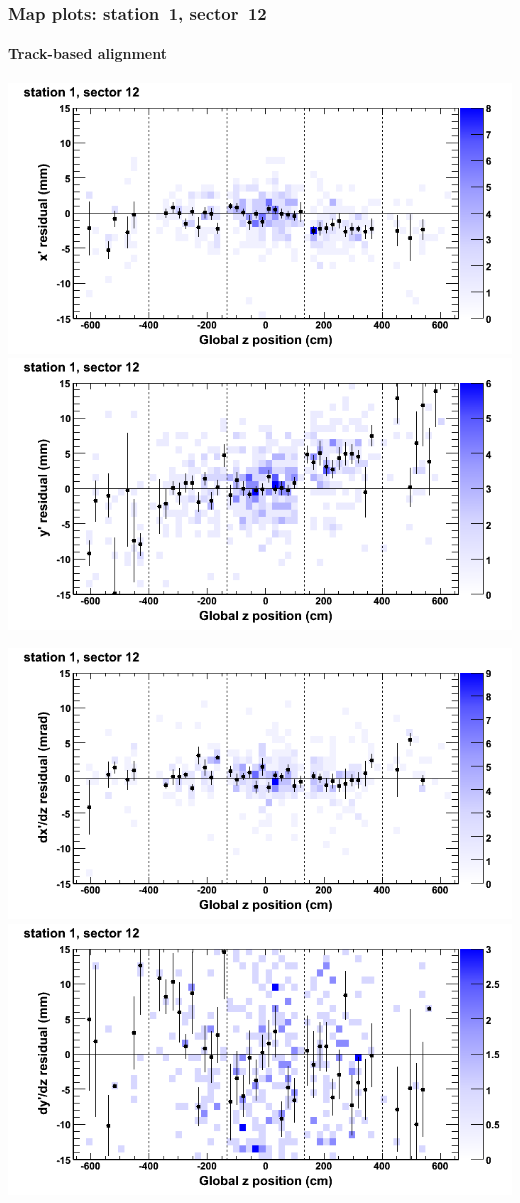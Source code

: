\documentclass[compress]{beamer}
\begin{document}
\begin{frame}
\frametitle{Map plots: station~1, sector~12}
\framesubtitle{Track-based alignment}
\includegraphics[width=0.5\linewidth]{mapplots_re05/DTvsz_st1sec12_x.png}
\includegraphics[width=0.5\linewidth]{mapplots_re05/DTvsz_st1sec12_y.png}

\includegraphics[width=0.5\linewidth]{mapplots_re05/DTvsz_st1sec12_dxdz.png}
\includegraphics[width=0.5\linewidth]{mapplots_re05/DTvsz_st1sec12_dydz.png}
\end{frame}
\end{document}
